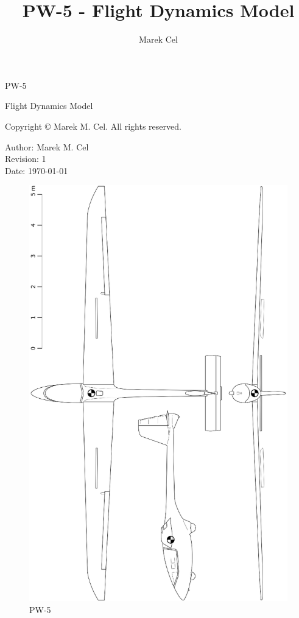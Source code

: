 \documentclass[12pt,a4paper]{article}
\title{PW-5 - Flight Dynamics Model}
\author{Marek Cel}
\date{}
\begin{document}
  
  \begin{titlepage}
    \centering
    {\huge PW-5 \par Flight Dynamics Model\par}
  \end{titlepage}
  

  \noindent Copyright \copyright{} \the\year{} Marek M. Cel. All rights reserved.

  \noindent Author: Marek M. Cel \\
  Revision: 1 \\
  Date: \today

  
  \clearpage
  \thispagestyle{empty}
  
  \begin{figure}[p]
    \centering
    \includegraphics[width=180mm]{eps/pw5_3view.eps}
    \caption{PW-5}
  \end{figure}
\end{document}
